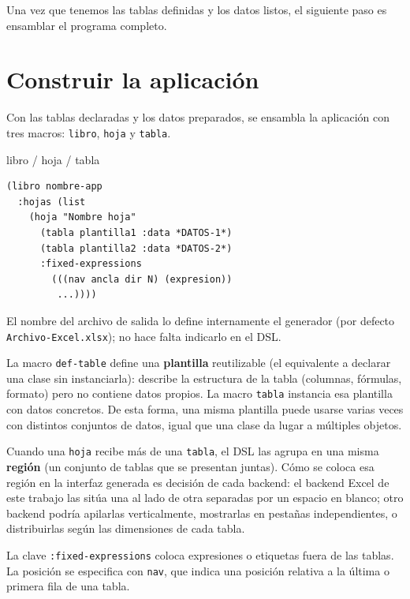 \documentclass[12pt,a4paper]{report}
\begin{document}
Una vez que tenemos las tablas definidas y los datos listos, el siguiente
paso es ensamblar el programa completo.

\section{Construir la aplicación}
\label{sec:libro}

Con las tablas declaradas y los datos preparados, se ensambla la aplicación
con tres macros: \texttt{libro}, \texttt{hoja} y \texttt{tabla}.

\begin{sintaxisbox}{libro / hoja / tabla}
\begin{lstlisting}
(libro nombre-app
  :hojas (list
    (hoja "Nombre hoja"
      (tabla plantilla1 :data *DATOS-1*)
      (tabla plantilla2 :data *DATOS-2*)
      :fixed-expressions
        (((nav ancla dir N) (expresion))
         ...))))
\end{lstlisting}
\end{sintaxisbox}

El nombre del archivo de salida lo define internamente el generador (por
defecto \texttt{Archivo-Excel.xlsx}); no hace falta indicarlo en el DSL.

La macro \texttt{def-table} define una \textbf{plantilla} reutilizable
(el equivalente a declarar una clase sin instanciarla): describe la
estructura de la tabla (columnas, fórmulas, formato) pero no contiene
datos propios.  La macro \texttt{tabla} instancia esa plantilla con
datos concretos.  De esta forma, una misma plantilla puede usarse varias
veces con distintos conjuntos de datos, igual que una clase da lugar a
múltiples objetos.

Cuando una \texttt{hoja} recibe más de una \texttt{tabla}, el DSL las
agrupa en una misma \textbf{región} (un conjunto de tablas que se
presentan juntas).  Cómo se coloca esa región en la interfaz generada
es decisión de cada backend: el backend Excel de este trabajo las sitúa
una al lado de otra separadas por un espacio en blanco; otro backend
podría apilarlas verticalmente, mostrarlas en pestañas independientes,
o distribuirlas según las dimensiones de cada tabla.

La clave \texttt{:fixed-expressions} coloca expresiones o etiquetas fuera
de las tablas.  La posición se especifica con \texttt{nav}, que indica una
posición relativa a la última o primera fila de una tabla.
\end{document}
